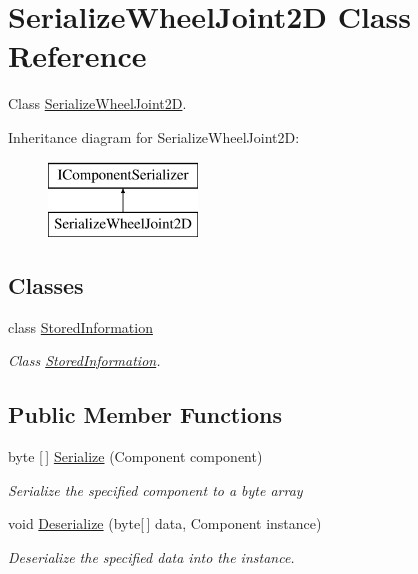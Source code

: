 \hypertarget{class_serialize_wheel_joint2_d}{}\section{Serialize\+Wheel\+Joint2D Class Reference}
\label{class_serialize_wheel_joint2_d}


Class \hyperlink{class_serialize_wheel_joint2_d}{Serialize\+Wheel\+Joint2D}.  


Inheritance diagram for Serialize\+Wheel\+Joint2D\+:\begin{figure}[H]
\begin{center}
\leavevmode
\includegraphics[height=2.000000cm]{class_serialize_wheel_joint2_d}
\end{center}
\end{figure}
\subsection*{Classes}
\begin{DoxyCompactItemize}
\item 
class \hyperlink{class_serialize_wheel_joint2_d_1_1_stored_information}{Stored\+Information}
\begin{DoxyCompactList}\small\item\em Class \hyperlink{class_serialize_wheel_joint2_d_1_1_stored_information}{Stored\+Information}. \end{DoxyCompactList}\end{DoxyCompactItemize}
\subsection*{Public Member Functions}
\begin{DoxyCompactItemize}
\item 
byte \mbox{[}$\,$\mbox{]} \hyperlink{class_serialize_wheel_joint2_d_a832d5d2bce3ce68dfb32b5b00fd45719}{Serialize} (Component component)
\begin{DoxyCompactList}\small\item\em Serialize the specified component to a byte array \end{DoxyCompactList}\item 
void \hyperlink{class_serialize_wheel_joint2_d_af4223b135bd9cf9be33639922944f9de}{Deserialize} (byte\mbox{[}$\,$\mbox{]} data, Component instance)
\begin{DoxyCompactList}\small\item\em Deserialize the specified data into the instance. \end{DoxyCompactList}\end{DoxyCompactItemize}


